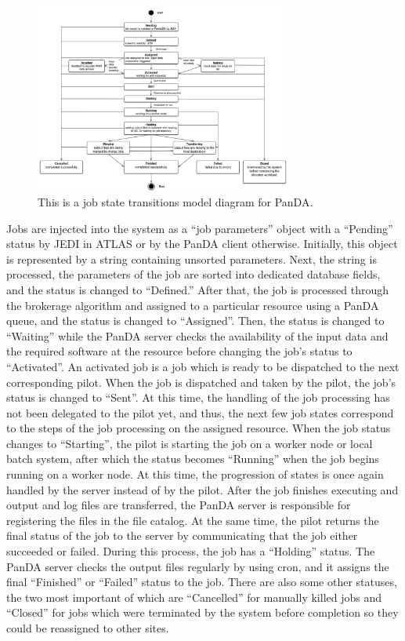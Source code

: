 \begin{figure}
  \includegraphics[width=0.75\textwidth]{images/job-state-diagram.png}
\caption{This is a job state transitions model diagram for PanDA.}
\label{fig:jobstates}
\end{figure}

Jobs are injected into the system as a ``job parameters'' object with a
``Pending'' status by JEDI in ATLAS or by the PanDA client otherwise.
Initially, this object is represented by a string containing unsorted
parameters. Next, the string is processed, the parameters of the job are sorted
into dedicated database fields, and the status is changed to ``Defined.'' After
that, the job is processed through the brokerage algorithm and assigned to a
particular resource using a PanDA queue, and the status is changed to
``Assigned''. Then, the status is changed to ``Waiting'' while the PanDA server
checks the availability of the input data and the required software at the
resource before changing the job's status to ``Activated''. An activated job is
a job which is ready to be dispatched to the next corresponding pilot. When the
job is dispatched and taken by the pilot, the job's status is changed to
``Sent''. At this time, the handling of the job processing has not been
delegated to the pilot yet, and thus, the next few job states correspond to the
steps of the job processing on the assigned resource. When the job status
changes to ``Starting'', the pilot is starting the job on a worker node or
local batch system, after which the status becomes ``Running'' when the job
begins running on a worker node. At this time, the progression of states is
once again handled by the server instead of by the pilot. After the job
finishes executing and output and log files are transferred, the PanDA server
is responsible for registering the files in the file catalog. At the same time,
the pilot returns the final status of the job to the server by communicating
that the job either succeeded or failed. During this process, the job has a
``Holding'' status. The PanDA server checks the output files regularly by using
cron, and it assigns the final ``Finished'' or ``Failed'' status to the job.
There are also some other statuses, the two most important of which are
``Cancelled'' for manually killed jobs and ``Closed'' for jobs which were
terminated by the system before completion so they could be reassigned to other
sites.

